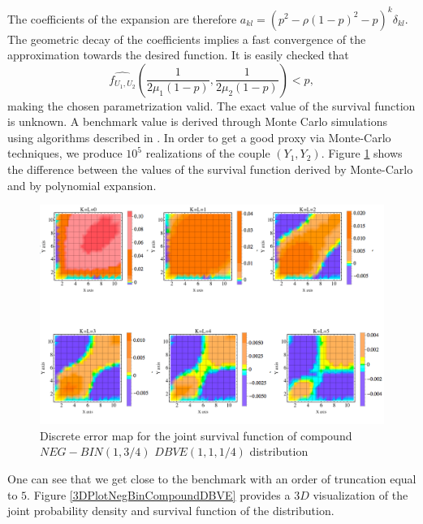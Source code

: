 The coefficients of the expansion are therefore $a_{kl}=(p^{2}-\rho(1-p)^{2}-p)^{k}\delta_{kl}$. The geometric decay of the coefficients implies a fast convergence of the approximation towards the desired function. It is easily checked that 
\begin{equation*}
\widehat{f_{U_{1},U_{2}}}\left(\frac{1}{2\mu_{1}(1-p)},\frac{1}{2\mu_{2}(1-p)}\right)<p, 
\end{equation*}
making the chosen parametrization valid. The exact value of the survival function is unknown. A benchmark value is derived through Monte Carlo simulations using algorithms described in \citet{60}. In order to get a good proxy via Monte-Carlo techniques, we produce $10^{5}$ realizations of the couple $(Y_{1},Y_{2})$. Figure \ref{NegBinCompoundDBVE} shows the difference between the values of the survival function derived by Monte-Carlo and by polynomial expansion. 
\begin{center}
	\begin{figure}[h!]
		\begin{center}
			\includegraphics[width=12cm]{Chapitre5/GraphErrorSurvivalNegBinGDBVE.png}
			\caption{Discrete error map for the joint survival function of compound $NEG-BIN(1,3/4)$ $DBVE(1,1,1/4)$ distribution}\label{NegBinCompoundDBVE}
		\end{center}
	\end{figure}
\end{center}
One can see that we get close to the benchmark with an order of truncation equal to $5$. Figure \ref{3DPlotNegBinCompoundDBVE} provides a $3D$ visualization of the joint probability density and survival function of the distribution. 
